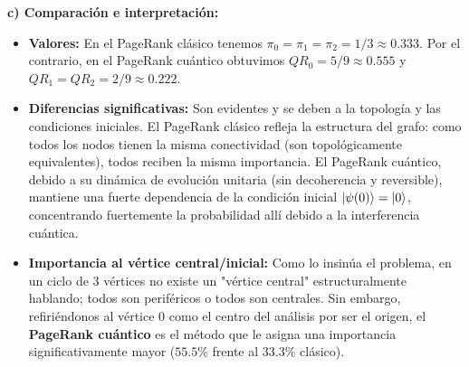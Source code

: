 \vspace{0.5cm}
\textbf{c) Comparación e interpretación:}
\begin{itemize}
    \item \textbf{Valores:} En el PageRank clásico tenemos $\pi_0 = \pi_1 = \pi_2 = 1/3 \approx 0.333$. Por el contrario, en el PageRank cuántico obtuvimos $QR_0 = 5/9 \approx 0.555$ y $QR_1 = QR_2 = 2/9 \approx 0.222$.
    \item \textbf{Diferencias significativas:} Son evidentes y se deben a la topología y las condiciones iniciales. El PageRank clásico refleja la estructura del grafo: como todos los nodos tienen la misma conectividad (son topológicamente equivalentes), todos reciben la misma importancia. El PageRank cuántico, debido a su dinámica de evolución unitaria (sin decoherencia y reversible), mantiene una fuerte dependencia de la condición inicial $\ket{\psi(0)} = \ket{0}$, concentrando fuertemente la probabilidad allí debido a la interferencia cuántica.
    \item \textbf{Importancia al vértice central/inicial:} Como lo insinúa el problema, en un ciclo de 3 vértices no existe un "vértice central" estructuralmente hablando; todos son periféricos o todos son centrales. Sin embargo, refiriéndonos al vértice 0 como el centro del análisis por ser el origen, el \textbf{PageRank cuántico} es el método que le asigna una importancia significativamente mayor ($55.5\%$ frente al $33.3\%$ clásico).
\end{itemize}
